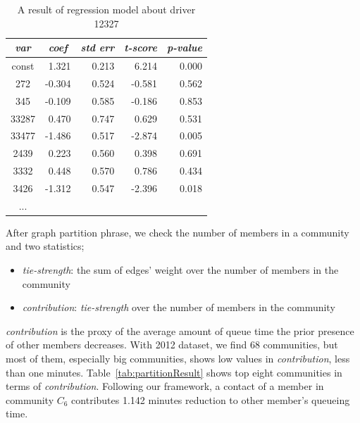 \documentclass{article}
\begin{document}
\begin{table}[h]
    \caption{A result of regression model about driver 12327}
    \vspace{-0.3 cm}
    \begin{center}
        \begin{tabular}{c|rrrr}
              \emph{var}     & \multicolumn{1}{c}{\emph{coef} }    & \multicolumn{1}{c}{\emph{std err}}    & \multicolumn{1}{c}{\emph{t-score}}    & \multicolumn{1}{c}{\emph{p-value}} \\
          \hline
            const     & 1.321     & 0.213     & 6.214     & 0.000 \\
            272         & -0.304     & 0.524     & -0.581     & 0.562 \\
            345         & -0.109     & 0.585     & -0.186     & 0.853 \\
            33287     & 0.470     & 0.747     & 0.629     & 0.531 \\
            33477     & -1.486     & 0.517     & -2.874     & 0.005 \\
            2439     & 0.223     & 0.560     & 0.398     & 0.691 \\
            3332     & 0.448     & 0.570     & 0.786     & 0.434 \\
            3426     & -1.312     & 0.547     & -2.396     & 0.018 \\
            ...            &                &                &                &        
        \end{tabular}
    \label{tab:resultInfluenceRegression}
    \end{center}
    \vspace{-0.3 cm}
\end{table}

After graph partition phrase, we check the number of members in a community and two statistics; 

\begin{itemize}
    \item \emph{tie-strength}: the sum of edges' weight over the number of members in the community
    \item \emph{contribution}: \emph{tie-strength} over the number of members in the community
\end{itemize}

\noindent \emph{contribution} is the proxy of the average amount of queue time the prior presence of other members decreases. With 2012 dataset, we find 68 communities, but most of them, especially big communities, shows low values in \emph{contribution}, less than one minutes. Table~\ref{tab:partitionResult} shows top eight communities in terms of \emph{contribution}. Following our framework, a contact of a member in community $C_6$ contributes 1.142 minutes reduction to other member's queueing time.
\end{document}
